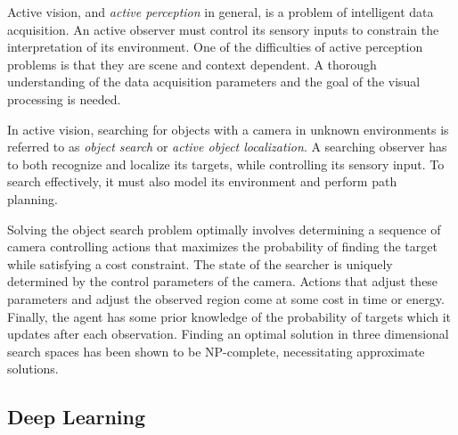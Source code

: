 Active vision, and \textit{active perception} in general, is a problem of intelligent data acquisition.
An active observer must control its sensory inputs to constrain the interpretation of its environment.
One of the difficulties of active perception problems is that they are scene and context dependent.
A thorough understanding of the data acquisition parameters and the goal of the visual processing is needed.~\cite{bajcsy_active_1988}




In active vision, searching for objects with a camera in unknown environments is referred to as \textit{object search} or \textit{active object localization}.
A searching observer has to both recognize and localize its targets, while controlling its sensory input.
To search effectively, it must also model its environment and perform path planning.~\cite{chen_active_2011}

Solving the object search problem optimally involves determining a sequence of camera controlling actions that maximizes the probability of finding the target while satisfying a cost constraint.
The state of the searcher is uniquely determined by the control parameters of the camera.
Actions that adjust these parameters and adjust the observed region come at some cost in time or energy.
Finally, the agent has some prior knowledge of the probability of targets which it updates after each observation.
Finding an optimal solution in three dimensional search spaces has been shown to be NP-complete, necessitating approximate solutions.~\cite{ye_complexity-level_2001,andreopoulos_theory_2009}

\subsection{Deep Learning}
\label{sec:deeplearning}

